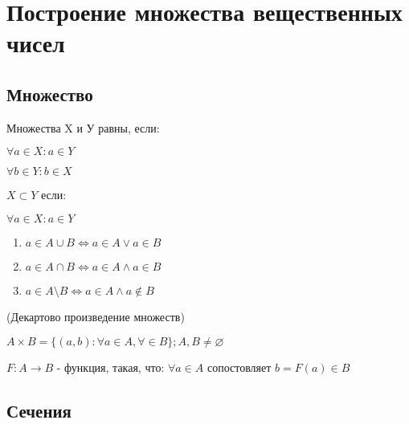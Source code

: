 

\chapter{Построение множества вещественных чисел}


\section{Множество}

\begin{definition}
    Множества X и У равны, если:
    
    $\forall a \in X: a \in Y$

    $\forall b \in Y: b \in X$
\end{definition}

\begin{definition}
    $X \subset Y$ если:
    
    $\forall a \in X: a \in Y$
\end{definition}

\begin{definition}
    \begin{enumerate}
        \item $a \in A \cup B \Leftrightarrow a \in A \lor a \in B$
        \item $a \in A \cap B \Leftrightarrow a \in A \land a \in B$
        \item $a \in A \setminus B \Leftrightarrow a \in A \land a \notin B$
    \end{enumerate}
\end{definition}

\begin{definition} (Декартово произведение множеств)
    
    $A \times B = \{(a, b): \forall a \in A, \forall \in B\}; A, B \neq \varnothing$
\end{definition}

\begin{definition}

    $F: A \rightarrow B$ - функция, такая, что: $\forall a \in A$ сопостовляет $b = F(a) \in B$
\end{definition}

\section{Сечения}

